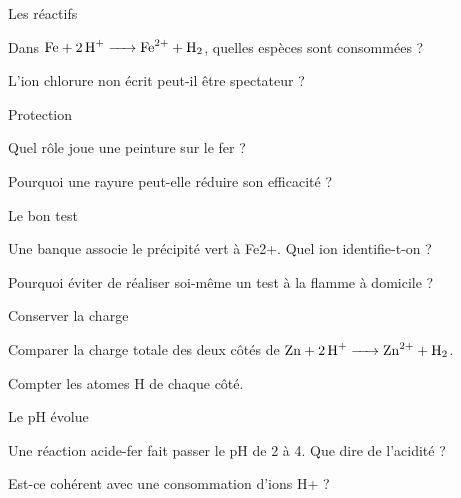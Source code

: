 \par\noindent\begin{minipage}{\linewidth}
\begin{exercice}[1]{Les réactifs}
\begin{questions}
\item Dans $\ce{Fe + 2 H+ -> Fe^{2+} + H2}$, quelles espèces sont consommées ?
\item L’ion chlorure non écrit peut-il être spectateur ?
\end{questions}
\end{exercice}
\end{minipage}
\par\noindent\begin{minipage}{\linewidth}
\begin{exercice}[1]{Protection}
\begin{questions}
\item Quel rôle joue une peinture sur le fer ?
\item Pourquoi une rayure peut-elle réduire son efficacité ?
\end{questions}
\end{exercice}
\end{minipage}
\par\noindent\begin{minipage}{\linewidth}
\begin{exercice}[1]{Le bon test}
\begin{questions}
\item Une banque associe le précipité vert à Fe2+. Quel ion identifie-t-on ?
\item Pourquoi éviter de réaliser soi-même un test à la flamme à domicile ?
\end{questions}
\end{exercice}
\end{minipage}
\clearpage{}
\par\noindent\begin{minipage}{\linewidth}
\begin{exercice}[2]{Conserver la charge}
\begin{questions}
\item Comparer la charge totale des deux côtés de $\ce{Zn + 2 H+ -> Zn^{2+} + H2}$.
\item Compter les atomes H de chaque côté.
\end{questions}
\end{exercice}
\end{minipage}
\par\noindent\begin{minipage}{\linewidth}
\begin{exercice}[2]{Le pH évolue}
\begin{questions}
\item Une réaction acide-fer fait passer le pH de 2 à 4. Que dire de l’acidité ?
\item Est-ce cohérent avec une consommation d’ions H+ ?
\end{questions}
\end{exercice}
\end{minipage}
